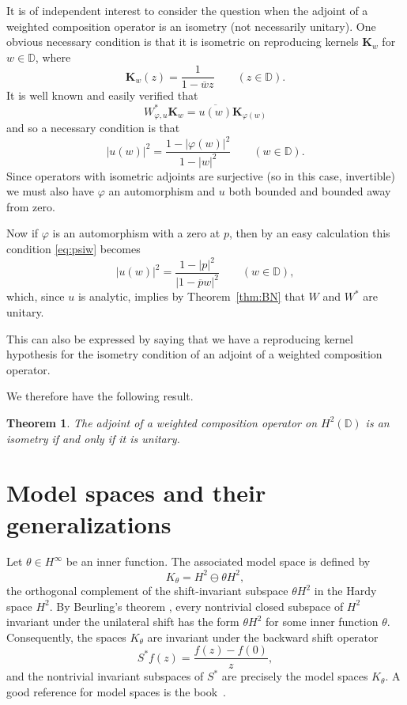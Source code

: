 \documentclass[11pt]{amsart}
\newtheorem{thm}{Theorem}[section]
\theoremstyle{definition}
\theoremstyle{remark}
\numberwithin{equation}{section}
\def\DD{{\mathbb D}}
\def\phi{\varphi}
\begin{document}
It is of independent interest to consider the question when the adjoint of a weighted composition operator is an isometry (not necessarily unitary). One obvious necessary condition is
that it is isometric on reproducing kernels $\mathbf{K}_w$ for $w \in \DD$, where
\[
\mathbf{K}_w(z)= \frac{1}{1-\overline w z} \qquad (z \in \DD).
\]
It is well known and easily verified that
\[
W_{\phi, u}^* \mathbf{K}_w = \overline{ u(w)} \mathbf{K}_{\phi(w)}
\]
and so a necessary condition is that
\begin{equation}\label{eq:psiw}
| u(w)|^2 = \frac{1-|\phi(w)|^2}{1-|w|^2} \qquad (w \in \DD).
\end{equation}
Since operators with isometric adjoints are surjective (so in this case, invertible) we
must also have $\phi$ an automorphism and $ u$ both bounded and bounded away from zero.

Now if $\phi$ is an automorphism with a zero at $p$, then by an easy calculation this condition \eqref{eq:psiw} becomes
\[
| u(w)|^2 = \frac{1-|p|^2}{|1-\overline p w|^2} \qquad (w \in \DD),
\]
which, since $ u$ is analytic, implies by Theorem~\ref{thm:BN} that $W$ and $W^*$ are
unitary.

This can also be expressed by saying that we have a reproducing kernel hypothesis for
the isometry condition of an adjoint of a weighted composition operator.

We therefore have the following result.

\begin{thm}
The adjoint of a weighted composition operator on $H^2(\DD)$ is an isometry if and only
if it is unitary.
\end{thm}




\section{Model spaces and their generalizations}\label{sec:6}

Let $\theta \in H^\infty$ be an inner function. The associated model space is
defined by
\[
K_\theta= H^2 \ominus \theta H^2,
\]
the orthogonal complement of the shift-invariant subspace $\theta H^2$ in the
Hardy space $H^2$. By Beurling's theorem \cite{Beu}, every nontrivial closed subspace of $H^2$ invariant under
the unilateral shift has the form $\theta H^2$ for some inner function $\theta$.
Consequently, the spaces $K_\theta$ are invariant under the backward shift operator
\[
S^*f(z)=\frac{f(z)-f(0)}{z},
\]
and the nontrivial invariant subspaces of $S^*$ are precisely the model spaces
$K_\theta$. A good reference for model spaces is the book~\cite{GMR}.
\end{document}
